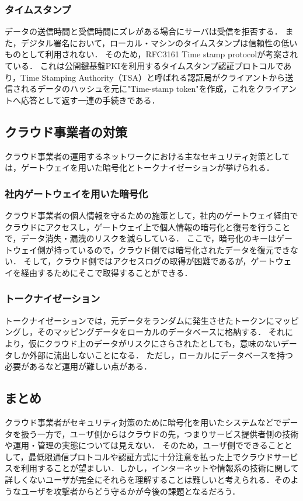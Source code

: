 \subsubsection{タイムスタンプ}
データの送信時間と受信時間にズレがある場合にサーバは受信を拒否する．
また，デジタル署名において，ローカル・マシンのタイムスタンプは信頼性の低いものとして利用されない．
そのため，RFC3161 Time stamp protocolが考案されている．
これは公開鍵基盤PKIを利用するタイムスタンプ認証プロトコルであり，Time Stamping Authority（TSA）と呼ばれる認証局がクライアントから送信されるデータのハッシュを元に"Time-stamp token"を作成，これをクライアントへ応答として返す一連の手続きである．


\subsection{クラウド事業者の対策}
クラウド事業者の運用するネットワークにおける主なセキュリティ対策としては，ゲートウェイを用いた暗号化とトークナイゼーションが挙げられる．

\subsubsection{社内ゲートウェイを用いた暗号化}
クラウド事業者の個人情報を守るための施策として，社内のゲートウェイ経由でクラウドにアクセスし，ゲートウェイ上で個人情報の暗号化と復号を行うことで，データ消失・漏洩のリスクを減らしている．
ここで，暗号化のキーはゲートウェイ側が持っているので，クラウド側では暗号化されたデータを復元できない．
そして，クラウド側ではアクセスログの取得が困難であるが，ゲートウェイを経由するためにそこで取得することができる．

\subsubsection{トークナイゼーション}
トークナイゼーションでは，元データをランダムに発生させたトークンにマッピングし，そのマッピングデータをローカルのデータベースに格納する．
それにより，仮にクラウド上のデータがリスクにさらされたとしても，意味のないデータしか外部に流出しないことになる．
ただし，ローカルにデータベースを持つ必要があるなど運用が難しい点がある．

\subsection{まとめ}
クラウド事業者がセキュリティ対策のために暗号化を用いたシステムなどでデータを扱う一方で，ユーザ側からはクラウドの先，つまりサービス提供者側の技術や運用・管理の実態については見えない．
そのため，ユーザ側でできることとして，最低限通信プロトコルや認証方式に十分注意を払った上でクラウドサービスを利用することが望ましい．しかし，インターネットや情報系の技術に関して詳しくないユーザが完全にそれらを理解することは難しいと考えられる．そのようなユーザを攻撃者からどう守るかが今後の課題となるだろう．
